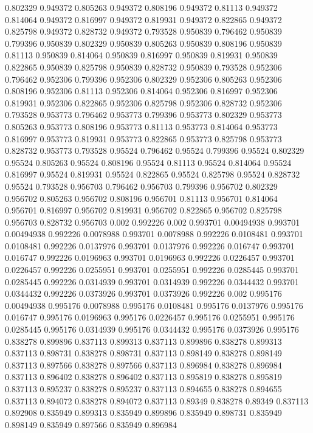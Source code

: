 0.802329 0.949372
0.805263 0.949372
0.808196 0.949372
0.81113 0.949372
0.814064 0.949372
0.816997 0.949372
0.819931 0.949372
0.822865 0.949372
0.825798 0.949372
0.828732 0.949372
0.793528 0.950839
0.796462 0.950839
0.799396 0.950839
0.802329 0.950839
0.805263 0.950839
0.808196 0.950839
0.81113 0.950839
0.814064 0.950839
0.816997 0.950839
0.819931 0.950839
0.822865 0.950839
0.825798 0.950839
0.828732 0.950839
0.793528 0.952306
0.796462 0.952306
0.799396 0.952306
0.802329 0.952306
0.805263 0.952306
0.808196 0.952306
0.81113 0.952306
0.814064 0.952306
0.816997 0.952306
0.819931 0.952306
0.822865 0.952306
0.825798 0.952306
0.828732 0.952306
0.793528 0.953773
0.796462 0.953773
0.799396 0.953773
0.802329 0.953773
0.805263 0.953773
0.808196 0.953773
0.81113 0.953773
0.814064 0.953773
0.816997 0.953773
0.819931 0.953773
0.822865 0.953773
0.825798 0.953773
0.828732 0.953773
0.793528 0.95524
0.796462 0.95524
0.799396 0.95524
0.802329 0.95524
0.805263 0.95524
0.808196 0.95524
0.81113 0.95524
0.814064 0.95524
0.816997 0.95524
0.819931 0.95524
0.822865 0.95524
0.825798 0.95524
0.828732 0.95524
0.793528 0.956703
0.796462 0.956703
0.799396 0.956702
0.802329 0.956702
0.805263 0.956702
0.808196 0.956701
0.81113 0.956701
0.814064 0.956701
0.816997 0.956702
0.819931 0.956702
0.822865 0.956702
0.825798 0.956703
0.828732 0.956703
0.002 0.992226
0.002 0.993701
0.00494938 0.993701
0.00494938 0.992226
0.0078988 0.993701
0.0078988 0.992226
0.0108481 0.993701
0.0108481 0.992226
0.0137976 0.993701
0.0137976 0.992226
0.016747 0.993701
0.016747 0.992226
0.0196963 0.993701
0.0196963 0.992226
0.0226457 0.993701
0.0226457 0.992226
0.0255951 0.993701
0.0255951 0.992226
0.0285445 0.993701
0.0285445 0.992226
0.0314939 0.993701
0.0314939 0.992226
0.0344432 0.993701
0.0344432 0.992226
0.0373926 0.993701
0.0373926 0.992226
0.002 0.995176
0.00494938 0.995176
0.0078988 0.995176
0.0108481 0.995176
0.0137976 0.995176
0.016747 0.995176
0.0196963 0.995176
0.0226457 0.995176
0.0255951 0.995176
0.0285445 0.995176
0.0314939 0.995176
0.0344432 0.995176
0.0373926 0.995176
0.838278 0.899896
0.837113 0.899313
0.837113 0.899896
0.838278 0.899313
0.837113 0.898731
0.838278 0.898731
0.837113 0.898149
0.838278 0.898149
0.837113 0.897566
0.838278 0.897566
0.837113 0.896984
0.838278 0.896984
0.837113 0.896402
0.838278 0.896402
0.837113 0.895819
0.838278 0.895819
0.837113 0.895237
0.838278 0.895237
0.837113 0.894655
0.838278 0.894655
0.837113 0.894072
0.838278 0.894072
0.837113 0.89349
0.838278 0.89349
0.837113 0.892908
0.835949 0.899313
0.835949 0.899896
0.835949 0.898731
0.835949 0.898149
0.835949 0.897566
0.835949 0.896984
